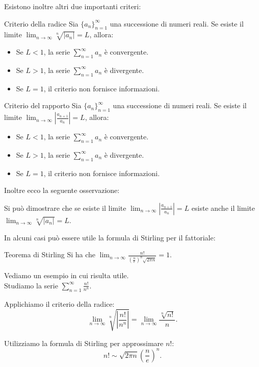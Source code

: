 Esistono inoltre altri due importanti criteri:
\begin{teorema}{Criterio della radice}
  Sia $\{a_n\}_{n=1}^{\infty}$ una successione di numeri reali. Se esiste il limite $\lim_{n \to \infty} \sqrt[n]{|a_n|} = L$, allora:
  \begin{itemize}
    \item Se $L < 1$, la serie $\sum_{n=1}^{\infty} a_n$ è convergente.
    \item Se $L > 1$, la serie $\sum_{n=1}^{\infty} a_n$ è divergente.
    \item Se $L = 1$, il criterio non fornisce informazioni.
  \end{itemize}
\end{teorema}
\begin{teorema}{Criterio del rapporto}
  Sia $\{a_n\}_{n=1}^{\infty}$ una successione di numeri reali. Se esiste il limite $\lim_{n \to \infty} \left| \frac{a_{n+1}}{a_n} \right| = L$, allora:
  \begin{itemize}
    \item Se $L < 1$, la serie $\sum_{n=1}^{\infty} a_n$ è convergente.
    \item Se $L > 1$, la serie $\sum_{n=1}^{\infty} a_n$ è divergente.
    \item Se $L = 1$, il criterio non fornisce informazioni.
  \end{itemize}
\end{teorema}


Inoltre ecco la seguente osservazione:
\begin{osservazione}{}
  Si può dimostrare che se esiste il limite $\lim_{n \to \infty} \left| \frac{a_{n+1}}{a_n} \right| = L$ esiste anche il limite $\lim_{n \to \infty} \sqrt[n]{|a_n|} = L$.
\end{osservazione}

In alcuni casi può essere utile la formula di Stirling per il fattoriale:
\begin{teorema}{Teorema di Stirling}
  Si ha che $\lim_{n \to \infty} \frac{n!}{(\frac{n}{e})^n \sqrt{2\pi n}} = 1$.
\end{teorema}
Vediamo un esempio in cui risulta utile.\\
Studiamo la serie $\sum_{n=1}^{\infty} \frac{n!}{n^n}$.

Applichiamo il criterio della radice:
\[
\lim_{n \to \infty} \sqrt[n]{\left| \frac{n!}{n^n} \right|} = \lim_{n \to \infty} \frac{\sqrt[n]{n!}}{n}.
\]

Utilizziamo la formula di Stirling per approssimare $n!$:
\[
n! \sim \sqrt{2\pi n} \left( \frac{n}{e} \right)^n.
\]


